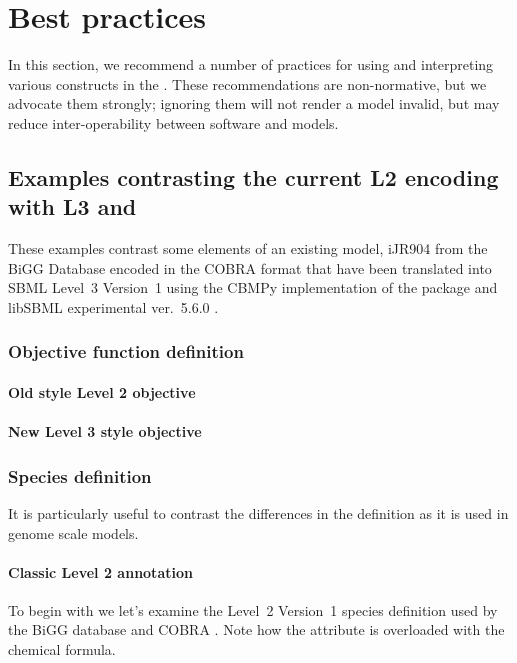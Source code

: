 
\section{Best practices}
\label{best-practices}

In this section, we recommend a number of practices for using and
interpreting various constructs in the \FBCPackage.
These recommendations are non-normative, but we advocate them strongly;
ignoring them will not render a model invalid, but may reduce
inter-operability between software and models.

\subsection{Examples contrasting the current \SBML L2 encoding with L3 and \FBC}
These examples contrast some elements of an existing model, iJR904 from the \textsf{BiGG} Database encoded in the \textsf{COBRA} format \cite{ijr904, bigg, cobra} that have been translated into SBML Level~3 Version~1 using the \textsf{CBMPy} implementation of the \FBC package \cite{pysces, cbmpy} and \textsf{libSBML} experimental ver.~5.6.0 \cite{libsbml}.

\subsubsection*{Objective function definition}
\paragraph{Old style \SBML Level 2 objective}

\paragraph{New \SBML Level 3 style objective}
\protect{}

\newpage
\subsubsection*{Species definition}
It is particularly useful to contrast the differences in the \Species definition as it is used in genome scale models.

\paragraph{Classic \SBML Level 2 \Species annotation}
To begin with we let's examine the \SBML Level~2 Version~1 species definition used by the BiGG database and \textsf{COBRA} \cite{bigg, cobra}. Note how the  attribute is overloaded with the chemical formula.
%

